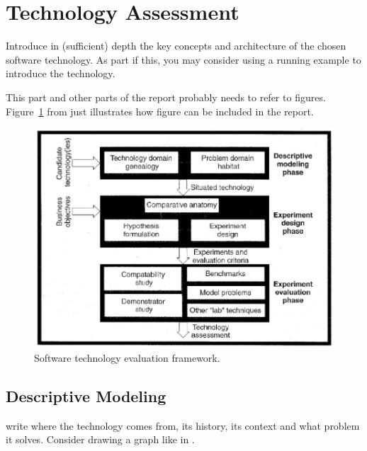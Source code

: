 \section{Technology Assessment}
\label{sec:technology}



Introduce in (sufficient) depth the key concepts and architecture of the chosen software technology. As part if this, you may consider using a running example to introduce the technology.

This part and other parts of the report probably needs to refer to
figures. Figure~\ref{fig:framework} from \cite{brown:96} just
illustrates how figure can be included in the report.

\begin{figure}[thb]
	\centering
	\includegraphics[scale=0.5]{figs/framework.png}
	\caption{Software technology evaluation framework.}
	\label{fig:framework}
\end{figure}

\subsection{Descriptive Modeling}

write where the technology comes from, its history, its context and what problem it solves.
Consider drawing a graph like in \cite{brown:96}.


